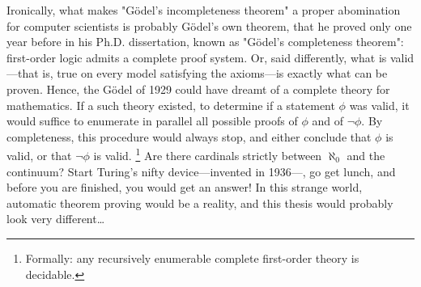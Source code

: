 Ironically, what makes "Gödel's incompleteness theorem" a proper
abomination  for computer scientists is probably Gödel's own theorem, that he proved only one year before in his
Ph.D. dissertation, known as "Gödel's completeness theorem": 
first-order logic admits a complete proof system. Or, said differently,
what is valid---that is, true on every model satisfying the axioms---is exactly what
can be proven. 
Hence, the Gödel of 1929 could have dreamt of a complete theory for mathematics.
If a such theory existed, to determine if a statement $\phi$ was valid, it would suffice
to enumerate in parallel all possible proofs of $\phi$ and of $\neg \phi$. By completeness, this 
procedure would always stop, and either conclude that $\phi$ is valid, or that
$\neg \phi$ is valid.%
\footnote{Formally: any recursively enumerable complete first-order theory is decidable.}
Are there cardinals strictly between $\aleph_0$ and the continuum?
Start Turing's nifty device---invented in 1936---, go get lunch, and before you are finished,
you would get an answer! In this strange world, automatic theorem proving would be a reality,
and this thesis would probably look very different…

